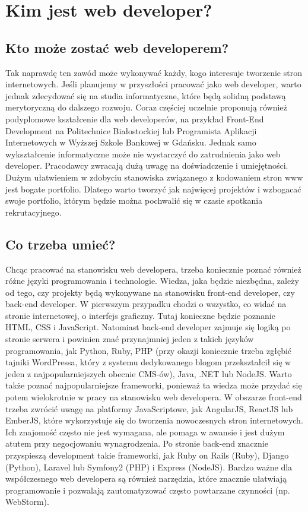 \documentclass[12pt]{report}
\begin{document}
	\newpage
	\chapter{Kim jest web developer?}
	\section{Kto może zostać web developerem?}
	Tak naprawdę ten zawód może wykonywać każdy, kogo interesuje tworzenie stron internetowych. Jeśli planujemy w przyszłości pracować jako web developer, warto jednak zdecydować się na studia informatyczne, które będą solidną podstawą merytoryczną do dalszego rozwoju. Coraz częściej uczelnie proponują również podyplomowe kształcenie dla web developerów, na przykład Front-End Development na Politechnice Białostockiej lub Programista Aplikacji Internetowych w Wyższej Szkole Bankowej w Gdańsku. Jednak samo wykształcenie informatyczne może nie wystarczyć do zatrudnienia jako web developer. Pracodawcy zwracają dużą uwagę na doświadczenie i umiejętności. Dużym ułatwieniem w zdobyciu stanowiska związanego z kodowaniem stron www jest bogate portfolio. Dlatego warto tworzyć jak najwięcej projektów i wzbogacać swoje portfolio, którym będzie można pochwalić się w czasie spotkania rekrutacyjnego.
	\newpage
	\section{Co trzeba umieć?}
	Chcąc pracować na stanowisku web developera, trzeba koniecznie poznać również różne języki programowania i technologie. Wiedza, jaka będzie niezbędna, zależy od tego, czy projekty będą wykonywane na stanowisku front-end developer, czy back-end developer. W pierwszym przypadku chodzi o wszystko, co widać na stronie internetowej, o interfejs graficzny. Tutaj konieczne będzie poznanie HTML, CSS i JavaScript. Natomiast back-end developer zajmuje się logiką po stronie serwera i powinien znać przynajmniej jeden z takich języków programowania, jak Python, Ruby, PHP (przy okazji koniecznie trzeba zgłębić tajniki WordPressa, który z systemu dedykowanego blogom przekształcił się w jeden z najpopularniejszych obecnie CMS-ów), Java, .NET lub NodeJS. Warto także poznać najpopularniejsze frameworki, ponieważ ta wiedza może przydać się potem wielokrotnie w pracy na stanowisku web developera. W obszarze front-end trzeba zwrócić uwagę na platformy JavaScriptowe, jak AngularJS, ReactJS lub EmberJS, które wykorzystuje się do tworzenia nowoczesnych stron internetowych. Ich znajomość często nie jest wymagana, ale pomaga w awansie i jest dużym atutem przy negocjowaniu wynagrodzenia. Po stronie back-end znacznie przyspieszą development takie frameworki, jak Ruby on Rails (Ruby), Django (Python), Laravel lub Symfony2 (PHP) i Express (NodeJS). Bardzo ważne dla współczesnego web developera są również narzędzia, które znacznie ułatwiają programowanie i pozwalają zautomatyzować często powtarzane czynności (np. WebStorm).
	
\end{document}
